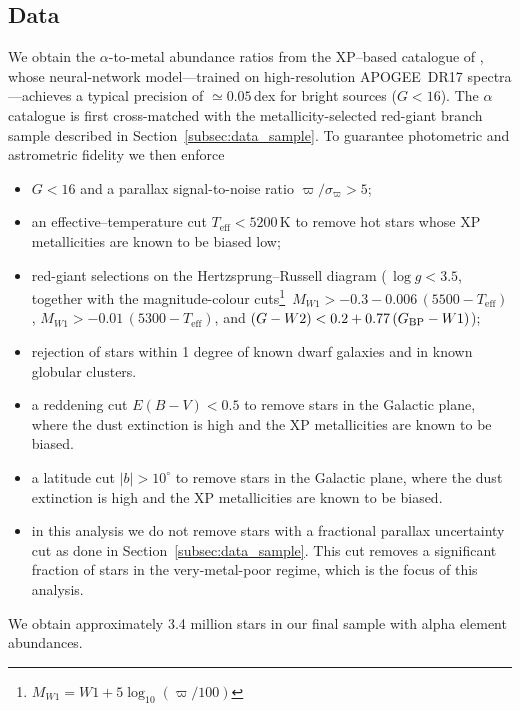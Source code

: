 \documentclass[a4paper,12pt]{article}
\begin{document}
\subsection{Data}


We obtain the $\alpha$-to-metal abundance ratios from the
XP–based catalogue of \citet{Li2024}, whose neural-network
model—trained on high-resolution \textsc{APOGEE}~DR17
spectra—achieves a typical precision of $\simeq0.05$\,dex for
bright sources ($G<16$).  
The $\alpha$ catalogue is first cross-matched with the
metallicity-selected red-giant branch sample described in
Section~\ref{subsec:data_sample}.  
To guarantee photometric and astrometric fidelity we then enforce

\begin{itemize}\setlength\itemsep{2pt}
  \item $G<16$ and a parallax signal-to-noise ratio
        $\varpi/\sigma_\varpi>5$;
  \item an effective–temperature cut $T_{\!\mathrm{eff}}<5200$\,K
        to remove hot stars whose XP metallicities are known to
        be biased low;
  \item red-giant selections on the Hertzsprung–Russell diagram
        (\,$\log g<3.5$, together with the magnitude-colour
        cuts\footnote{$M_{W1}=W1+5\log_{10}(\varpi/100)$}\,
        $M_{W1}>-0.3-0.006\,(5500-T_{\!\mathrm{eff}})$,
        $M_{W1}>-0.01\,(5300-T_{\!\mathrm{eff}})$, and
        $(G-W2)<0.2+0.77\,(G_{\rm BP}-W1)$);
  \item rejection of stars within 1 degree of known dwarf galaxies and
        in known globular clusters.
  \item a reddening cut $E(B-V)<0.5$ to remove stars in the Galactic
        plane, where the dust extinction is high and the XP
        metallicities are known to be biased.
  \item a latitude cut $|b|>10^\circ$ to remove stars in the
        Galactic plane, where the dust extinction is high and the
        XP metallicities are known to be biased.
  \item in this analysis we do not remove stars with a fractional 
        parallax uncertainty cut as done in Section~\ref{subsec:data_sample}.
        This cut removes a significant fraction of stars in the
        very-metal-poor regime, which is the focus of this analysis. 
\end{itemize}

We obtain approximately 3.4 million stars in our final sample with alpha element abundances.
\end{document}
